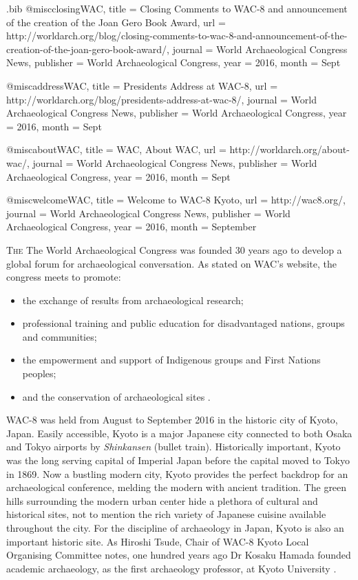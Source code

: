 \begin{filecontents}{\IJSRAidentifier.bib}
@misc{closingWAC,
	title = {Closing Comments to WAC-8 and announcement of the creation of the Joan Gero Book Award},
	url = {http://worldarch.org/blog/closing-comments-to-wac-8-and-announcement-of-the-creation-of-the-joan-gero-book-award/},
	journal = {World Archaeological Congress News},
	publisher = {World Archaeological Congress},
	year = {2016},
	month = {Sept}
}

@misc{addressWAC,
	title = {Presidents Address at WAC-8},
	url = {http://worldarch.org/blog/presidents-address-at-wac-8/},
	journal = {World Archaeological Congress News},
	publisher = {World Archaeological Congress},
	year = {2016},
	month = {Sept}
}

@misc{aboutWAC,
	title = {WAC, About WAC},
	url = {http://worldarch.org/about-wac/},
	journal = {World Archaeological Congress News},
	publisher = {World Archaeological Congress},
	year = {2016},
	month = {Sept}
}

@misc{welcomeWAC,
	title = {Welcome to WAC-8 Kyoto},
	url = {http://wac8.org/},
	journal = {World Archaeological Congress News},
	publisher = {World Archaeological Congress},
	year = {2016},
	month = {September}
}
\end{filecontents}

%
\IJSRAopening
\lettrine{T}{he} The World Archaeological Congress was founded 30 years ago to develop a global forum for archaeological conversation. As stated on WAC’s website, the congress meets to promote:
\begin{itemize}
	\item the exchange of results from archaeological research;
	\item professional training and public education for disadvantaged nations, groups and communities;
	\item the empowerment and support of Indigenous groups and First Nations peoples;
	\item and the conservation of archaeological sites \parencite{aboutWAC}.
\end{itemize}

WAC-8 was held from August  to September  2016 in the historic city of Kyoto, Japan. Easily accessible, Kyoto is a major Japanese city connected to both Osaka and Tokyo airports by \textit{Shinkansen} (bullet train). Historically important, Kyoto was the long serving capital of Imperial Japan before the capital moved to Tokyo in 1869. Now a bustling modern city, Kyoto provides the perfect backdrop for an archaeological conference, melding the modern with ancient tradition. The green hills surrounding the modern urban center hide a plethora of cultural and historical sites, not to mention the rich variety of Japanese cuisine available throughout the city. For the discipline of archaeology in Japan, Kyoto is also an important historic site. As Hiroshi Tsude, Chair of WAC-8 Kyoto Local Organising Committee notes, one hundred years ago Dr Kosaku Hamada founded academic archaeology, as the first archaeology professor, at Kyoto University \parencite{welcomeWAC}. 


